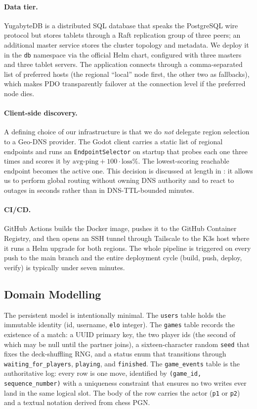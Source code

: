 \documentclass{scrartcl}
\begin{document}
\paragraph{Data tier.} YugabyteDB is a distributed SQL database that
speaks the PostgreSQL wire protocol but stores tablets through a Raft
replication group of three peers; an additional master service stores
the cluster topology and metadata. We deploy it in the \texttt{db}
namespace via the official Helm chart, configured with three masters
and three tablet servers. The application connects through a
comma-separated list of preferred hosts (the regional ``local'' node
first, the other two as fallbacks), which makes PDO transparently
failover at the connection level if the preferred node dies.

\paragraph{Client-side discovery.} A defining choice of our
infrastructure is that we do \emph{not} delegate region selection to a
Geo-DNS provider. The Godot client carries a static list of regional
endpoints and runs an \texttt{EndpointSelector} on startup that probes
each one three times and scores it by
$\text{avg-ping} + 100 \cdot \text{loss}\%$. The lowest-scoring reachable
endpoint becomes the active one. This decision is discussed at length in
: it allows us to perform global routing without
owning DNS authority and to react to outages in seconds rather than in
DNS-TTL-bounded minutes.

\paragraph{CI/CD.} GitHub Actions builds the Docker image, pushes it to
the GitHub Container Registry, and then opens an SSH tunnel through
Tailscale to the K3s host where it runs a Helm upgrade for both
regions. The whole pipeline is triggered on every push to the main
branch and the entire deployment cycle (build, push, deploy, verify) is
typically under seven minutes.

\subsection{Domain Modelling}\label{modelling}

The persistent model is intentionally minimal. The
\texttt{users} table holds the immutable identity (id, username,
\texttt{elo} integer). The \texttt{games} table records the existence
of a match: a UUID primary key, the two player ids (the second of which
may be null until the partner joins), a sixteen-character random
\texttt{seed} that fixes the deck-shuffling RNG, and a status enum that
transitions through \texttt{waiting\_for\_players}, \texttt{playing},
and \texttt{finished}. The \texttt{game\_events} table is the
authoritative log: every row is one move, identified by
\texttt{(game\_id, sequence\_number)} with a uniqueness constraint that
ensures no two writes ever land in the same logical slot. The body of
the row carries the actor (\texttt{p1} or \texttt{p2}) and a textual
notation derived from chess PGN.
\end{document}
